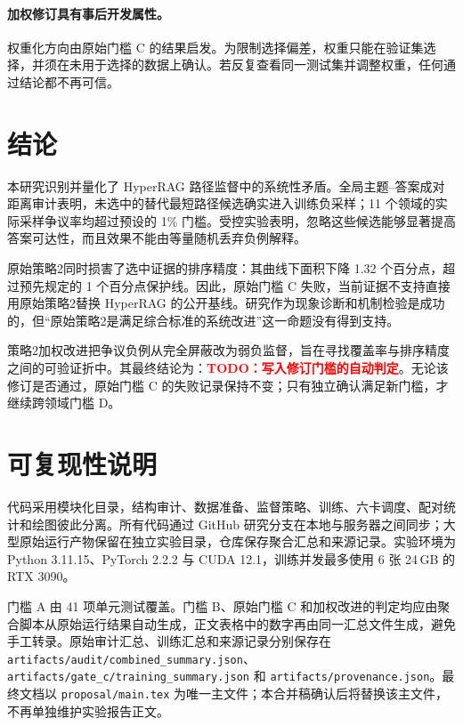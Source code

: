 \documentclass[UTF8,11pt]{ctexart}
\newcommand{\WeightedTodo}[1]{\textcolor{red}{\textbf{TODO：#1}}}
\newcommand{\WeightedDecision}{\WeightedTodo{写入修订门槛的自动判定}}
\begin{document}
\paragraph{加权修订具有事后开发属性。}
权重化方向由原始门槛 C 的结果启发。为限制选择偏差，权重只能在验证集选择，并须在未用于选择的数据上确认。若反复查看同一测试集并调整权重，任何通过结论都不再可信。

\section{结论}

本研究识别并量化了 HyperRAG 路径监督中的系统性矛盾。全局主题--答案成对距离审计表明，未选中的替代最短路径候选确实进入训练负采样；11 个领域的实际采样争议率均超过预设的 1\% 门槛。受控实验表明，忽略这些候选能够显著提高答案可达性，而且效果不能由等量随机丢弃负例解释。

原始策略2同时损害了选中证据的排序精度：其曲线下面积下降 1.32 个百分点，超过预先规定的 1 个百分点保护线。因此，原始门槛 C 失败，当前证据不支持直接用原始策略2替换 HyperRAG 的公开基线。研究作为现象诊断和机制检验是成功的，但“原始策略2是满足综合标准的系统改进”这一命题没有得到支持。

策略2加权改进把争议负例从完全屏蔽改为弱负监督，旨在寻找覆盖率与排序精度之间的可验证折中。其最终结论为：\WeightedDecision。无论该修订是否通过，原始门槛 C 的失败记录保持不变；只有独立确认满足新门槛，才继续跨领域门槛 D。

\section*{可复现性说明}

代码采用模块化目录，结构审计、数据准备、监督策略、训练、六卡调度、配对统计和绘图彼此分离。所有代码通过 GitHub 研究分支在本地与服务器之间同步；大型原始运行产物保留在独立实验目录，仓库保存聚合汇总和来源记录。实验环境为 Python 3.11.15、PyTorch 2.2.2 与 CUDA 12.1，训练并发最多使用 6 张 24\,GB 的 RTX 3090。

门槛 A 由 41 项单元测试覆盖。门槛 B、原始门槛 C 和加权改进的判定均应由聚合脚本从原始运行结果自动生成，正文表格中的数字再由同一汇总文件生成，避免手工转录。原始审计汇总、训练汇总和来源记录分别保存在 \texttt{artifacts/audit/combined\_summary.json}、\texttt{artifacts/gate\_c/training\_summary.json} 和 \texttt{artifacts/provenance.json}。最终文档以 \texttt{proposal/main.tex} 为唯一主文件；本合并稿确认后将替换该主文件，不再单独维护实验报告正文。

\begingroup
\footnotesize


\endgroup
\end{document}
